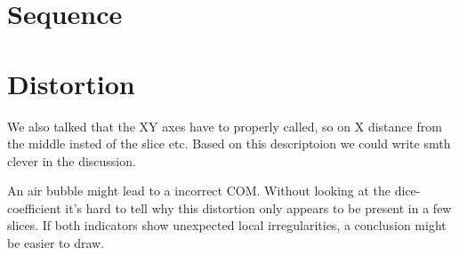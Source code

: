 \section{Sequence}

\section{Distortion}

We also talked that the XY axes have to properly called, so on X distance from the middle insted of the slice etc. Based on this descriptoion we could write smth clever in the discussion.  

An air bubble might lead to a incorrect COM. Without looking at the dice-coefficient it's hard to tell why this distortion only appears to be present in a few slices.
If both indicators show unexpected local irregularities, a conclusion might be easier to draw.


